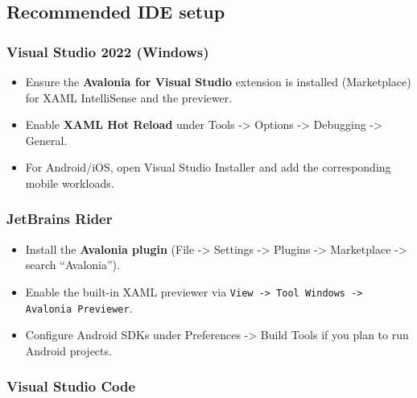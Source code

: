 \subsection{Recommended IDE setup}\label{recommended-ide-setup}

\subsubsection{Visual Studio 2022
(Windows)}\label{visual-studio-2022-windows}

\begin{itemize}
\tightlist
\item
  Ensure the \textbf{Avalonia for Visual Studio} extension is installed
  (Marketplace) for XAML IntelliSense and the previewer.
\item
  Enable \textbf{XAML Hot Reload} under Tools -\textgreater{} Options
  -\textgreater{} Debugging -\textgreater{} General.
\item
  For Android/iOS, open Visual Studio Installer and add the
  corresponding mobile workloads.
\end{itemize}

\subsubsection{JetBrains Rider}\label{jetbrains-rider}

\begin{itemize}
\tightlist
\item
  Install the \textbf{Avalonia plugin} (File -\textgreater{} Settings
  -\textgreater{} Plugins -\textgreater{} Marketplace -\textgreater{}
  search ``Avalonia'').
\item
  Enable the built-in XAML previewer via
  \passthrough{\lstinline!View -> Tool Windows -> Avalonia Previewer!}.
\item
  Configure Android SDKs under Preferences -\textgreater{} Build Tools
  if you plan to run Android projects.
\end{itemize}

\subsubsection{Visual Studio Code}\label{visual-studio-code}

